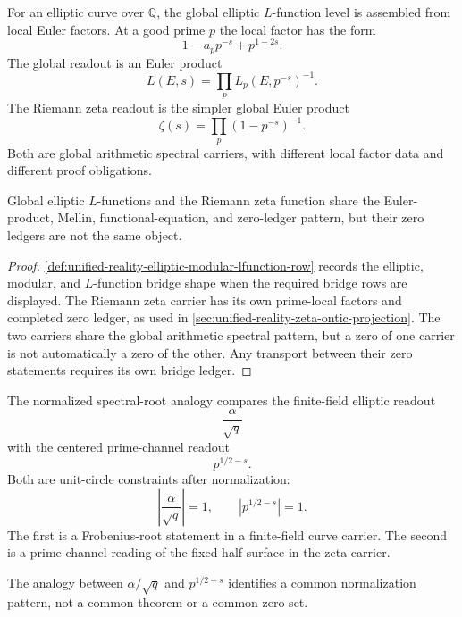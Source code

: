 \begin{definition}
\label{def:unified-reality-global-elliptic-zeta-zero-level}
For an elliptic curve over $\mathbb Q$, the global elliptic $L$-function
level is assembled from local Euler factors.  At a good prime $p$ the
local factor has the form
$$
1-a_p p^{-s}+p^{1-2s}.
$$
The global readout is an Euler product
$$
L(E,s)=\prod_p L_p(E,p^{-s})^{-1}.
$$
The Riemann zeta readout is the simpler global Euler product
$$
\zeta(s)=\prod_p(1-p^{-s})^{-1}.
$$
Both are global arithmetic spectral carriers, with different local
factor data and different proof obligations.
\end{definition}

\begin{theorem}
\label{thm:unified-reality-global-elliptic-lfunctions-higher-siblings}
Global elliptic $L$-functions and the Riemann zeta function share the
Euler-product, Mellin, functional-equation, and zero-ledger pattern, but
their zero ledgers are not the same object.
\end{theorem}

\begin{proof}
\autoref{def:unified-reality-elliptic-modular-lfunction-row} records the
elliptic, modular, and $L$-function bridge shape when the required
bridge rows are displayed.  The Riemann zeta carrier has its own
prime-local factors and completed zero ledger, as used in
\autoref{sec:unified-reality-zeta-ontic-projection}.  The two carriers
share the global arithmetic spectral pattern, but a zero of one carrier
is not automatically a zero of the other.  Any transport between their
zero statements requires its own bridge ledger.
\end{proof}

\begin{definition}
\label{def:unified-reality-normalized-spectral-root-analogy}
The normalized spectral-root analogy compares the finite-field elliptic
readout
$$
\frac{\alpha}{\sqrt q}
$$
with the centered prime-channel readout
$$
p^{1/2-s}.
$$
Both are unit-circle constraints after normalization:
$$
\left|\frac{\alpha}{\sqrt q}\right|=1,
\qquad
|p^{1/2-s}|=1.
$$
The first is a Frobenius-root statement in a finite-field curve carrier.
The second is a prime-channel reading of the fixed-half surface in the
zeta carrier.
\end{definition}

\begin{theorem}
\label{thm:unified-reality-unit-circle-analogies-carrier-separation}
The analogy between $\alpha/\sqrt q$ and $p^{1/2-s}$ identifies a common
normalization pattern, not a common theorem or a common zero set.
\end{theorem}


